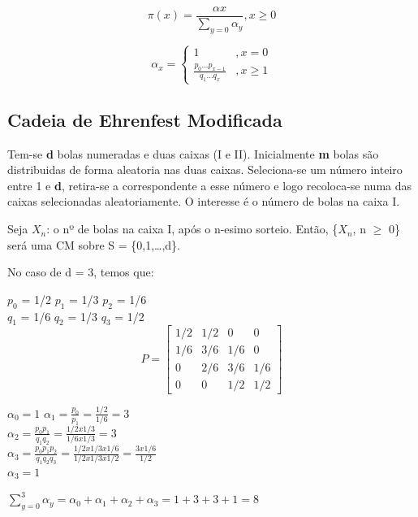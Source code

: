 \documentclass[]{article}
\theoremstyle{definition}
\theoremstyle{definition}
\theoremstyle{definition}
\theoremstyle{remark}
\begin{document}
\[\pi(x)= \frac{\alpha x}{\sum_{y=0} \alpha_y}, x \geq 0\]

\begin{equation}
\alpha_x = \left\{\begin{matrix}
1 &, x =0 \\
\frac{p_0...p_{x-1}}{q_1...q_x} &, x \geq 1
\end{matrix}\right.
\end{equation}

\subsection{Cadeia de Ehrenfest
Modificada}\label{cadeia-de-ehrenfest-modificada}

Tem-se \textbf{d} bolas numeradas e duas caixas (I e II). Inicialmente
\textbf{m} bolas são distribuidas de forma aleatoria nas duas caixas.
Seleciona-se um número inteiro entre 1 e \textbf{d}, retira-se a
correspondente a esse número e logo recoloca-se numa das caixas
selecionadas aleatoriamente. O interesse é o número de bolas na caixa I.

Seja \(X_n\): o nº de bolas na caixa I, após o n-esimo sorteio. Então,
\{\(X_n\), n \(\geq\) 0\} será uma CM sobre S = \{0,1,\ldots{},d\}.

No caso de d = 3, temos que:

\(p_0\) = 1/2 \(p_1\) = 1/3 \(p_2\) = 1/6\\
\(q_1\) = 1/6 \(q_2\) = 1/3 \(q_3\) = 1/2\\

\begin{equation}
P = \begin{bmatrix}
1/2 & 1/2 & 0 & 0 \\
1/6 & 3/6 & 1/6 & 0\\
0 & 2/6 & 3/6 & 1/6\\
0 & 0 & 1/2 & 1/2
\end{bmatrix}
\end{equation}

\(\alpha_0=1\) \(\alpha_1= \frac{p_0}{p_1} = \frac{1/2}{1/6}=3\)\\
\(\alpha_2=\frac{p_0p_1}{q_1q_2}=\frac{1/2 x 1/3}{1/6 x 1/3} = 3\)\\
\(\alpha_3=\frac{p_0p_1p_2}{q_1q_2q_3}=\frac{1/2 x 1/3 x 1/6}{1/2 x 1/3 x 1/2}= \frac{3 x 1/6}{1/2}\)\\
\(\alpha_3=1\)

\(\sum_{y=0}^3 \alpha_y = \alpha_0 + \alpha_1 + \alpha_2 + \alpha_3 = 1 + 3 + 3 + 1 = 8\)
\end{document}

